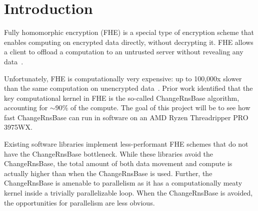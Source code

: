 \section{Introduction}\label{sec:introduction}

\figUsecase

Fully homomorphic encryption (FHE) is a special type of encryption scheme that
enables computing on encrypted data directly, without decrypting it. FHE allows
a client to offload a computation to an untrusted server without revealing any
data~\cite{chen:ccs17:privset-fhe,DBLP:conf/tcc/GentryH19,gilad:icml16:cryptonets}.

Unfortunately, FHE is computationally very expensive: up to 100,000x slower
than the same computation on unencrypted data~\cite{halevi:crypto14:algorithms-helib}.
Prior work identified that the key computational kernel in FHE is the so-called
ChangeRnsBase algorithm, accounting for $\sim$90\% of the
compute\cite{samardzic:isca22:craterlake}.
The goal of this project will be to see how fast ChangeRnsBase can run in
software on an AMD Ryzen Threadripper PRO 3975WX.

Existing software libraries implement less-performant FHE schemes that do not
have the ChangeRnsBase bottleneck.
While these libraries avoid the
ChangeRnsBase, the total amount of both data movement and compute is actually
higher than when the ChangeRnsBase is used\cite{samardzic:isca22:craterlake}.
Further, the ChangeRnsBase is amenable to parallelism as it has a
computationally meaty kernel inside a trivially parallelizable loop.
When the ChangeRnsBase is avoided, the opportunities for parallelism are less
obvious.

